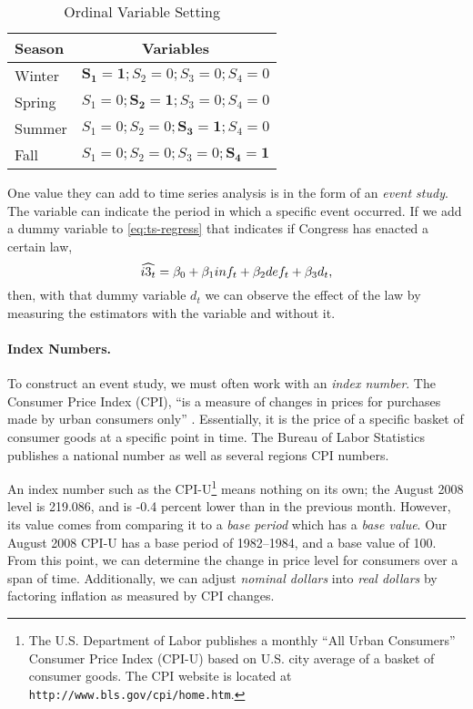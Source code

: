 \begin{table}[tbp]
	\centering
	\begin{tabular}{lc}
	\toprule
	Season & Variables \\
	\hline
	Winter & $\mathbf{S_1=1}; S_2 = 0; S_3 = 0; S_4 = 0$ \\
	Spring & $S_1=0; \mathbf{S_2 = 1}; S_3 = 0; S_4 = 0$ \\
	Summer & $S_1=0; S_2 = 0; \mathbf{S_3 = 1}; S_4 = 0$ \\
	Fall & $S_1=0; S_2 = 0; S_3 = 0; \mathbf{S_4 = 1}$ \\
	\bottomrule
	\end{tabular}
   \caption{Ordinal Variable Setting}
   \label{tab:ord-variable}
\end{table}

One value they can add to time series analysis is in the form of an \emph{event study}. The variable can indicate the period in which a specific event occurred. If we add a dummy variable to \eqref{eq:ts-regress} that indicates if Congress has enacted a certain law,
\[
\widehat{i3_t} = \beta_0 + \beta_1 inf_t + \beta_2 def_t + \beta_3 d_t,
\index{beta@$\beta$ (beta)!in regression}
\]
then, with that dummy variable $d_t$ we can observe the effect of the law by measuring the estimators with the variable and without it.

\paragraph{Index Numbers.}
To construct an event study, we must often work with an \emph{index number}.  The Consumer Price Index (CPI), ``is a measure of changes in prices for purchases made by urban consumers only'' \cite[p. 91]{rogers-1998}. Essentially, it is the price of a specific basket of consumer goods at a specific point in time. The Bureau of Labor Statistics publishes a national number as well as several regions CPI numbers.

An index number such as the CPI-U\footnote{The U.S. Department of Labor publishes a monthly ``All Urban Consumers'' Consumer Price Index (CPI-U) based on U.S. city average of a basket of consumer goods. The CPI website is located at \texttt{http://www.bls.gov/cpi/home.htm}.} means nothing on its own; the August 2008 level is 219.086, and is -0.4 percent lower than in the previous month. However, its value comes from comparing it to a \emph{base period}  which has a \emph{base value}.  Our August 2008 CPI-U has a base period of 1982--1984, and a base value of 100. From this point, we can determine the change in price level for consumers over a span of time. Additionally, we can adjust \emph{nominal dollars} into \emph{real dollars} by factoring inflation as measured by CPI changes.

